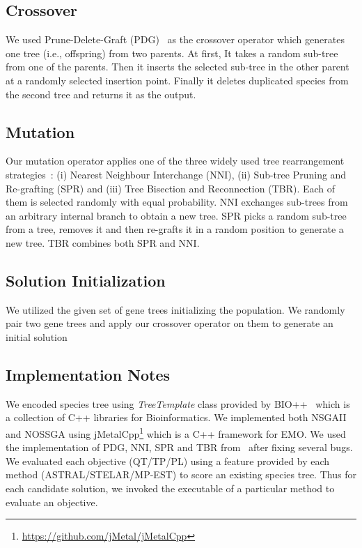 \subsection{Crossover}\label{subsec:crossver}
We used Prune-Delete-Graft (PDG)~\cite{villalobos2018memetic} as the crossover operator which generates one tree (i.e., offspring) from two parents. At first, It takes a random sub-tree from
one of the parents. Then it inserts the selected sub-tree in the other parent at a
randomly selected insertion point. Finally it deletes duplicated species
from the second tree and returns it as the output.

\subsection{Mutation} \label{subsec:mutation}
Our mutation operator applies one of the three widely used tree rearrangement strategies~\cite{felsenstein2004inferring}: (i) Nearest Neighbour
Interchange (NNI), (ii) Sub-tree Pruning and Re-grafting
(SPR) and (iii) Tree Bisection and Reconnection (TBR). Each of them is selected randomly with equal probability. NNI
exchanges sub-trees from an arbitrary internal branch to obtain
a new tree. SPR picks a random sub-tree from a tree, removes it and then re-grafts it in a random
position to generate a new tree. TBR combines both
SPR and NNI.

\subsection{Solution Initialization}\label{subsec:init}
We utilized the given set of gene trees initializing the population. We randomly pair two gene trees and apply our crossover operator on them to generate an initial solution


\subsection{Implementation Notes}
We encoded species tree using \textit{TreeTemplate} class provided by BIO++~\cite{gueguen2013bpp} which is a collection of C++ libraries for Bioinformatics. We implemented both NSGAII and NOSSGA using jMetalCpp\footnote{\url{https://github.com/jMetal/jMetalCpp}} which is a C++ framework for EMO. We used the implementation of PDG, NNI, SPR and TBR from~\cite{zambrano2016mo} after fixing several bugs. We evaluated each objective (QT/TP/PL) using a feature provided by each method (ASTRAL/STELAR/MP-EST) to score an existing species tree. Thus for each candidate solution, we invoked the executable of a particular method to evaluate an objective.


